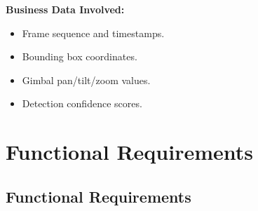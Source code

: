 \documentclass[12pt]{article}
\begin{document}
\textbf{Business Data Involved:}
\begin{itemize}
  \item Frame sequence and timestamps.
  \item Bounding box coordinates.
  \item Gimbal pan/tilt/zoom values.
  \item Detection confidence scores.
\end{itemize}


\section{Functional Requirements}
\subsection{Functional Requirements}
\end{document}
